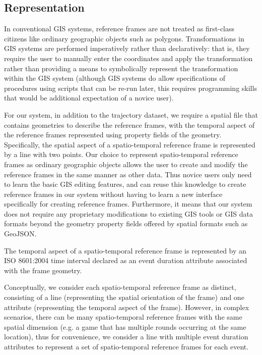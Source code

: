 \subsection{Representation}

In conventional GIS systems, reference frames are not treated as first-class citizens like ordinary geographic objects such as polygons. Transformations in GIS systems are performed imperatively rather than declaratively: that is, they require the user to manually enter the coordinates and apply the transformation rather than providing a means to symbolically represent the transformation within the GIS system (although GIS systems do allow specifications of procedures using scripts that can be re-run later, this requires programming skills that would be additional expectation of a novice user).

For our system, in addition to the trajectory dataset, we require a spatial file that contains geometries to describe the reference frames, with the temporal aspect of the reference frames represented using property fields of the geometry. Specifically, the spatial aspect of a spatio-temporal reference frame is represented by a line with two points. Our choice to represent spatio-temporal reference frames as ordinary geographic objects allows the user to create and modify the reference frames in the same manner as other data. Thus novice users only need to learn the basic GIS editing features, and can reuse this knowledge to create reference frames in our system without having to learn a new interface specifically for creating reference frames. Furthermore, it means that our system does not require any proprietary modifications to existing GIS tools or GIS data formats beyond the geometry property fields offered by spatial formats such as GeoJSON.


The temporal aspect of a spatio-temporal reference frame is represented by an ISO 8601:2004 time interval declared as an event duration attribute associated with the frame geometry.




 Conceptually, we consider each spatio-temporal reference frame as distinct, consisting of a line (representing the spatial orientation of the frame) and one attribute (representing the temporal aspect of the frame). However, in complex scenarios, there can be many spatio-temporal reference frames with the same spatial dimension (e.g. a game that has multiple rounds occurring at the same location), thus for convenience, we consider a line with multiple event duration attributes to represent a set of spatio-temporal reference frames for each event.






